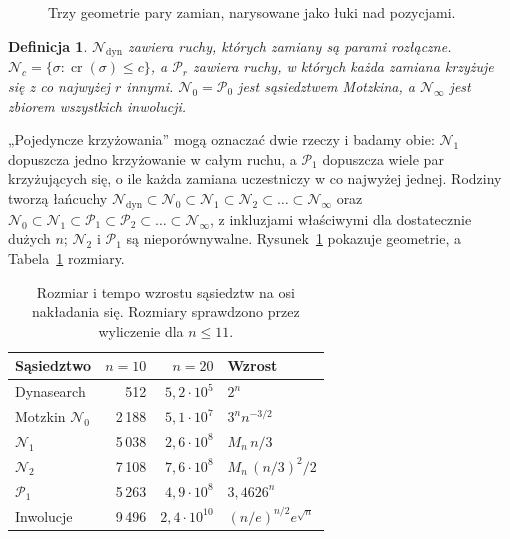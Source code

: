 \documentclass[10pt,twocolumn]{article}
\newtheorem{definition}{Definicja}
\newcommand{\N}{\mathcal{N}}
\newcommand{\Pa}{\mathcal{P}}
\newcommand{\ncr}{\operatorname{cr}}
\begin{document}
\begin{figure}[t]
\centering
{}
\caption{Trzy geometrie pary zamian, narysowane jako łuki nad pozycjami.}
\label{fig:geometry}
\end{figure}

\begin{definition}
$\N_{\mathrm{dyn}}$ zawiera ruchy, których zamiany są parami rozłączne.
$\N_c=\{\sigma:\ncr(\sigma)\leq c\}$, a $\Pa_r$ zawiera ruchy,
w których każda zamiana krzyżuje się z co najwyżej $r$ innymi.
$\N_0=\Pa_0$ jest sąsiedztwem Motzkina, a $\N_\infty$ jest zbiorem
wszystkich inwolucji.
\end{definition}

„Pojedyncze krzyżowania” mogą oznaczać dwie rzeczy i badamy obie: $\N_1$
dopuszcza jedno krzyżowanie w całym ruchu, a $\Pa_1$ dopuszcza wiele par
krzyżujących się, o ile każda zamiana uczestniczy w co najwyżej jednej.
Rodziny tworzą łańcuchy
$\N_{\mathrm{dyn}}\subset\N_0\subset\N_1\subset\N_2\subset\dots\subset\N_\infty$
oraz $\N_0\subset\N_1\subset\Pa_1\subset\Pa_2\subset\dots\subset\N_\infty$,
z inkluzjami właściwymi dla dostatecznie dużych $n$; $\N_2$ i $\Pa_1$
są nieporównywalne. Rysunek~\ref{fig:geometry} pokazuje geometrie,
a Tabela~\ref{tab:taxonomy} rozmiary.

\begin{table}[t]
\centering
\caption{Rozmiar i tempo wzrostu sąsiedztw na osi nakładania się.
Rozmiary sprawdzono przez wyliczenie dla $n\leq 11$.}
\label{tab:taxonomy}
\small
\begin{tabular}{@{}lrrl@{}}
\toprule
Sąsiedztwo & $n=10$ & $n=20$ & Wzrost \\
\midrule
Dynasearch & 512 & $5{,}2{\cdot}10^5$ & $2^n$ \\
Motzkin $\N_0$ & 2\,188 & $5{,}1{\cdot}10^7$ & $3^n n^{-3/2}$ \\
$\N_1$ & 5\,038 & $2{,}6{\cdot}10^8$ & $M_n\,n/3$ \\
$\N_2$ & 7\,108 & $7{,}6{\cdot}10^8$ & $M_n\,(n/3)^2/2$ \\
$\Pa_1$ & 5\,263 & $4{,}9{\cdot}10^8$ & $3{,}4626^n$ \\
Inwolucje & 9\,496 & $2{,}4{\cdot}10^{10}$ & $(n/e)^{n/2}e^{\sqrt n}$ \\
\bottomrule
\end{tabular}
\end{table}
\end{document}
